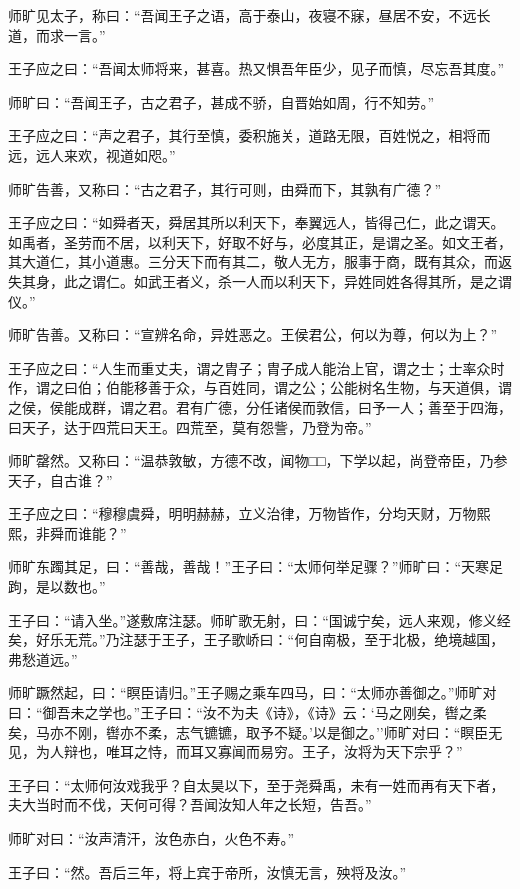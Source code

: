 \documentclass[]{article}
\begin{document}
师旷见太子，称曰：``吾闻王子之语，高于泰山，夜寝不寐，昼居不安，不远长道，而求一言。''

王子应之曰：``吾闻太师将来，甚喜。热又惧吾年臣少，见子而慎，尽忘吾其度。''

师旷曰：``吾闻王子，古之君子，甚成不骄，自晋始如周，行不知劳。''

王子应之曰：``声之君子，其行至慎，委积施关，道路无限，百姓悦之，相将而远，远人来欢，视道如咫。''

师旷告善，又称曰：``古之君子，其行可则，由舜而下，其孰有广德？''

王子应之曰：``如舜者天，舜居其所以利天下，奉翼远人，皆得己仁，此之谓天。如禹者，圣劳而不居，以利天下，好取不好与，必度其正，是谓之圣。如文王者，其大道仁，其小道惠。三分天下而有其二，敬人无方，服事于商，既有其众，而返失其身，此之谓仁。如武王者义，杀一人而以利天下，异姓同姓各得其所，是之谓仪。''

师旷告善。又称曰：``宣辨名命，异姓恶之。王侯君公，何以为尊，何以为上？''

王子应之曰：``人生而重丈夫，谓之胄子；胄子成人能治上官，谓之士；士率众时作，谓之曰伯；伯能移善于众，与百姓同，谓之公；公能树名生物，与天道俱，谓之侯，侯能成群，谓之君。君有广德，分任诸侯而敦信，曰予一人；善至于四海，曰天子，达于四荒曰天王。四荒至，莫有怨訾，乃登为帝。''

师旷罄然。又称曰：``温恭敦敏，方德不改，闻物□□，下学以起，尚登帝臣，乃参天子，自古谁？''

王子应之曰：``穆穆虞舜，明明赫赫，立义治律，万物皆作，分均天财，万物熙熙，非舜而谁能？''

师旷东躅其足，曰：``善哉，善哉！''王子曰：``太师何举足骤？''师旷曰：``天寒足跔，是以数也。''

王子曰：``请入坐。''遂敷席注瑟。师旷歌无射，曰：``国诚宁矣，远人来观，修义经矣，好乐无荒。''乃注瑟于王子，王子歌峤曰：``何自南极，至于北极，绝境越国，弗愁道远。''

师旷蹶然起，曰：``瞑臣请归。''王子赐之乘车四马，曰：``太师亦善御之。''师旷对曰：``御吾未之学也。''王子曰：``汝不为夫《诗》，《诗》云：`马之刚矣，辔之柔矣，马亦不刚，辔亦不柔，志气镳镳，取予不疑。'以是御之。''师旷对曰：``瞑臣无见，为人辩也，唯耳之恃，而耳又寡闻而易穷。王子，汝将为天下宗乎？''

王子曰：``太师何汝戏我乎？自太昊以下，至于尧舜禹，未有一姓而再有天下者，夫大当时而不伐，天何可得？吾闻汝知人年之长短，告吾。''

师旷对曰：``汝声清汗，汝色赤白，火色不寿。''

王子曰：``然。吾后三年，将上宾于帝所，汝慎无言，殃将及汝。''
\end{document}
